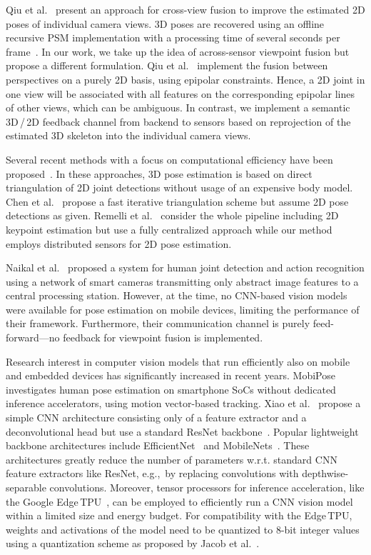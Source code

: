 \documentclass[conference]{IEEEtran}
\newcommand{\eg}{e.g.,\ }
\begin{document}
Qiu et al.~\cite{qiu_cross_2019} present an approach for cross-view fusion to improve the estimated 2D poses of individual camera views. 3D poses are recovered using an offline recursive PSM implementation with a processing time of several seconds per frame~\cite{remelli_lightweight_2020}.
In our work, we take up the idea of across-sensor viewpoint fusion but propose a different formulation. Qiu et al.~\cite{qiu_cross_2019} implement the fusion between perspectives on a purely 2D basis, using epipolar constraints. Hence, a 2D joint in one view will be associated with all features on the corresponding epipolar lines of other views, which can be ambiguous.
In contrast, we implement a semantic 3D\,/\,2D feedback channel from backend to sensors based on reprojection of the estimated 3D skeleton into the individual camera views.

Several recent methods with a focus on computational efficiency have been proposed~\cite{chen_crossview_2020,remelli_lightweight_2020}. In these approaches, 3D pose estimation is based on direct triangulation of 2D joint detections without usage of an expensive body model. Chen et al.~\cite{chen_crossview_2020} propose a fast iterative triangulation scheme but assume 2D pose detections as given. Remelli et al.~\cite{remelli_lightweight_2020} consider the whole pipeline including 2D keypoint estimation but use a fully centralized approach while our method employs distributed sensors for 2D pose estimation.

Naikal et al.~\cite{naikal_joint_2014} proposed a system for human joint detection and action recognition using a network of smart cameras transmitting only abstract image features to a central processing station. However, at the time, no CNN-based vision models were available for pose estimation on mobile devices, limiting the performance of their framework. Furthermore, their communication channel is purely feed-forward---no feedback for viewpoint fusion is implemented.

Research interest in computer vision models that run efficiently also on mobile and embedded devices has significantly increased in recent years.
MobiPose~\cite{zhang2020mobipose} investigates human pose estimation on smartphone SoCs without dedicated inference accelerators, using motion vector-based tracking. Xiao et al.~\cite{xiao_simple_2018} propose a simple CNN architecture consisting only of a feature extractor and a deconvolutional head but use a standard ResNet backbone~\cite{he_deep_2016}.
Popular lightweight backbone architectures include EfficientNet~\cite{tan_efficientnet_2019} and MobileNets~\cite{mobilenet_2017,mobilenetv32019}.
These architectures greatly reduce the number of parameters w.r.t. standard CNN feature extractors like ResNet, \eg by replacing convolutions with depthwise-separable convolutions.
Moreover, tensor processors for inference acceleration, like the Google Edge\,TPU~\cite{yazdanbakhsh_edgetpu_2021}, can be employed to efficiently run a CNN vision model within a limited size and energy budget. For compatibility with the Edge\,TPU, weights and activations of the model need to be quantized to 8-bit integer values using a quantization scheme as proposed by Jacob et al.~\cite{quantization_2018}.
\end{document}
